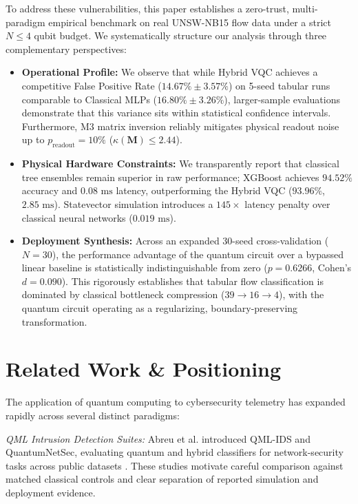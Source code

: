 \documentclass[conference]{IEEEtran}
\begin{document}
To address these vulnerabilities, this paper establishes a zero-trust, multi-paradigm empirical benchmark on real UNSW-NB15 flow data under a strict $N \le 4$ qubit budget. We systematically structure our analysis through three complementary perspectives:
\begin{itemize}
    \item \textbf{Operational Profile:} We observe that while Hybrid VQC achieves a competitive False Positive Rate ($14.67\% \pm 3.57\%$) on 5-seed tabular runs comparable to Classical MLPs ($16.80\% \pm 3.26\%$), larger-sample evaluations demonstrate that this variance sits within statistical confidence intervals. Furthermore, M3 matrix inversion reliably mitigates physical readout noise up to $p_{\text{readout}} = 10\%$ ($\kappa(\mathbf{M}) \le 2.44$).
    \item \textbf{Physical Hardware Constraints:} We transparently report that classical tree ensembles remain superior in raw performance; XGBoost achieves $94.52\%$ accuracy and $0.08\text{ ms}$ latency, outperforming the Hybrid VQC ($93.96\%$, $2.85\text{ ms}$). Statevector simulation introduces a $145\times$ latency penalty over classical neural networks ($0.019\text{ ms}$).
    \item \textbf{Deployment Synthesis:} Across an expanded 30-seed cross-validation ($N=30$), the performance advantage of the quantum circuit over a bypassed linear baseline is statistically indistinguishable from zero ($p = 0.6266$, Cohen's $d = 0.090$). This rigorously establishes that tabular flow classification is dominated by classical bottleneck compression ($39 \to 16 \to 4$), with the quantum circuit operating as a regularizing, boundary-preserving transformation.
\end{itemize}

\section{Related Work \& Positioning}
The application of quantum computing to cybersecurity telemetry has expanded rapidly across several distinct paradigms:

\textit{QML Intrusion Detection Suites:} Abreu et al. introduced QML-IDS and QuantumNetSec, evaluating quantum and hybrid classifiers for network-security tasks across public datasets \cite{abreu2024qml,abreu2025quantumnetsec}. These studies motivate careful comparison against matched classical controls and clear separation of reported simulation and deployment evidence.
\end{document}
